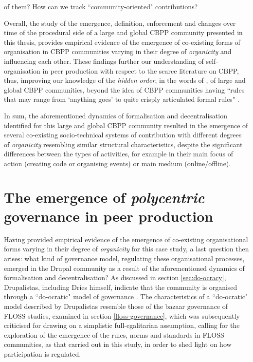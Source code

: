 of them? How can we track ``community-oriented" contributions?

Overall, the study of the emergence, definition, enforcement and changes over time of the procedural side of a large and global CBPP community presented in this thesis, provides empirical evidence of the emergence of co-existing forms of organisation in CBPP communities varying in their degree of \textit{organicity} and influencing each other. These findings further our understanding of self-organisation in peer production with respect to the scarce literature on CBPP, thus, improving our knowledge of the \textit{hidden order}, in the words of \textcite{viegas2007hidden}, of large and global CBPP communities, beyond the idea of CBPP communities having ``rules that may range from `anything goes' to quite crisply articulated formal rules" \parencite[61]{benkler2006wealth}.

In sum, the aforementioned dynamics of formalisation and decentralisation identified for this large and global CBPP community resulted in the emergence of several co-existing socio-technical systems of contribution with different degrees of \textit{organicity} resembling similar structural characteristics, despite the significant differences between the types of activities, for example in their main focus of action (creating code or organising events) or main medium (online/offline).

\section{The emergence of \textit{polycentric} governance in peer production}
\label{sec:hybrid-poly}

Having provided empirical evidence of the emergence of co-existing organisational forms varying in their degree of \textit{organicity} for this case study, a last question then arises: what kind of governance model, regulating these organisational processes, emerged in the Drupal community as a result of the aforementioned dynamics of formalisation and decentralisation? As discussed in section \ref{sec:do-ocracy}, Drupalistas, including Dries himself, indicate that the community is organised through a ``do-ocratic" model of governance \parencite[e.g.][]{do-ocracy01:2016:Online, do-ocracy02:2016:Online, do-ocracy03:2016:Online, do-ocracy04:2016:Online, do-ocracy05:2016:Online}. The characteristics of a ``do-ocratic" model described by Drupalistas resemble those of the bazaar governance \parencite{Demil2006} of FLOSS studies, examined in section \ref{floss-governance}, which was subsequently criticised \parencite{mateos2008institutions} for drawing on a simplistic full-egalitarian assumption, calling for the exploration of the emergence of the rules, norms and standards in FLOSS communities, as that carried out in this study, in order to shed light on how participation is regulated.

